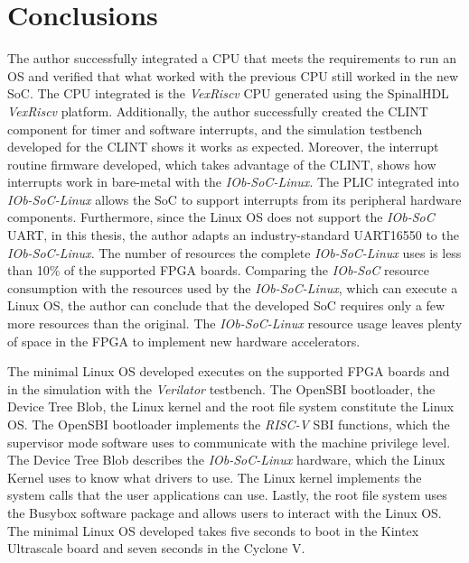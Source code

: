 
\section{Conclusions}
\label{sec:concl}
The author successfully integrated a CPU that meets the requirements to run an OS and verified that what worked with the previous CPU still worked in the new SoC. The CPU integrated is the \textit{VexRiscv} CPU generated using the SpinalHDL \textit{VexRiscv} platform. Additionally, the author successfully created the CLINT component for timer and software interrupts, and the simulation testbench developed for the CLINT shows it works as expected. Moreover, the interrupt routine firmware developed, which takes advantage of the CLINT, shows how interrupts work in bare-metal with the \textit{IOb-SoC-Linux}. The PLIC integrated into \textit{IOb-SoC-Linux} allows the SoC to support interrupts from its peripheral hardware components. Furthermore, since the Linux OS does not support the \textit{IOb-SoC} UART, in this thesis, the author adapts an industry-standard UART16550 to the \textit{IOb-SoC-Linux}. The number of resources the complete \textit{IOb-SoC-Linux} uses is less than 10\% of the supported FPGA boards. Comparing the \textit{IOb-SoC} resource consumption with the resources used by the \textit{IOb-SoC-Linux}, which can execute a Linux OS, the author can conclude that the developed SoC requires only a few more resources than the original. The \textit{IOb-SoC-Linux} resource usage leaves plenty of space in the FPGA to implement new hardware accelerators.

The minimal Linux OS developed executes on the supported FPGA boards and in the simulation with the \textit{Verilator} testbench. The OpenSBI bootloader, the Device Tree Blob, the Linux kernel and the root file system constitute the Linux OS. The OpenSBI bootloader implements the \textit{RISC-V} SBI functions, which the supervisor mode software uses to communicate with the machine privilege level. The Device Tree Blob describes the \textit{IOb-SoC-Linux} hardware, which the Linux Kernel uses to know what drivers to use. The Linux kernel implements the system calls that the user applications can use. Lastly, the root file system uses the Busybox software package and allows users to interact with the Linux OS. The minimal Linux OS developed takes five seconds to boot in the Kintex Ultrascale board and seven seconds in the Cyclone V.

